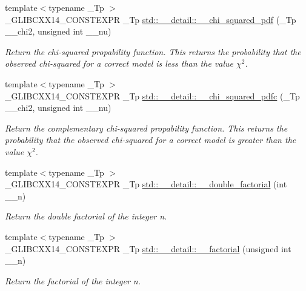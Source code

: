 \begin{DoxyCompactItemize}
{\footnotesize template$<$typename \+\_\+\+Tp $>$ }\\\+\_\+\+G\+L\+I\+B\+C\+X\+X14\+\_\+\+C\+O\+N\+S\+T\+E\+X\+P\+R \+\_\+\+Tp \hyperlink{namespacestd_1_1____detail_a4f1652a699029ddb7f38dbcc6f0c0371}{std\+::\+\_\+\+\_\+detail\+::\+\_\+\+\_\+chi\+\_\+squared\+\_\+pdf} (\+\_\+\+Tp \+\_\+\+\_\+chi2, unsigned int \+\_\+\+\_\+nu)
\begin{DoxyCompactList}\small\item\em Return the chi-\/squared propability function. This returns the probability that the observed chi-\/squared for a correct model is less than the value $ \chi^2 $. \end{DoxyCompactList}\item 
{\footnotesize template$<$typename \+\_\+\+Tp $>$ }\\\+\_\+\+G\+L\+I\+B\+C\+X\+X14\+\_\+\+C\+O\+N\+S\+T\+E\+X\+P\+R \+\_\+\+Tp \hyperlink{namespacestd_1_1____detail_a0e23bbba24b0d9ea8ab231a9ae88e503}{std\+::\+\_\+\+\_\+detail\+::\+\_\+\+\_\+chi\+\_\+squared\+\_\+pdfc} (\+\_\+\+Tp \+\_\+\+\_\+chi2, unsigned int \+\_\+\+\_\+nu)
\begin{DoxyCompactList}\small\item\em Return the complementary chi-\/squared propability function. This returns the probability that the observed chi-\/squared for a correct model is greater than the value $ \chi^2 $. \end{DoxyCompactList}\item 
{\footnotesize template$<$typename \+\_\+\+Tp $>$ }\\\+\_\+\+G\+L\+I\+B\+C\+X\+X14\+\_\+\+C\+O\+N\+S\+T\+E\+X\+P\+R \+\_\+\+Tp \hyperlink{namespacestd_1_1____detail_a06b0d9786afff0919c96f61d5f760c5f}{std\+::\+\_\+\+\_\+detail\+::\+\_\+\+\_\+double\+\_\+factorial} (int \+\_\+\+\_\+n)
\begin{DoxyCompactList}\small\item\em Return the double factorial of the integer n. \end{DoxyCompactList}\item 
{\footnotesize template$<$typename \+\_\+\+Tp $>$ }\\\+\_\+\+G\+L\+I\+B\+C\+X\+X14\+\_\+\+C\+O\+N\+S\+T\+E\+X\+P\+R \+\_\+\+Tp \hyperlink{namespacestd_1_1____detail_a8de5d6069cbef126684be0800f47f8b2}{std\+::\+\_\+\+\_\+detail\+::\+\_\+\+\_\+factorial} (unsigned int \+\_\+\+\_\+n)
\begin{DoxyCompactList}\small\item\em Return the factorial of the integer n. \end{DoxyCompactList}\item 

\end{DoxyCompactItemize}
